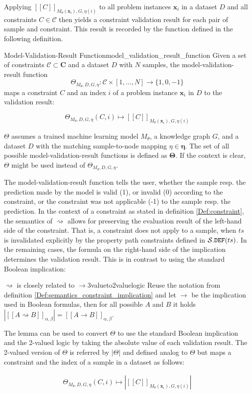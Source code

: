 Applying $[[C]]_{M_\theta(\mathbf{x}_i), G, \eta(i)}$ to all problem instances $\mathbf{x}_i$ in a dataset $D$ and all constraints $C \in \mathcal{C}$ then yields a constraint validation result for each pair of sample and constraint. This result is recorded by the function defined in the following definition.
\begin{Def}{Model-Validation-Result Function}{model_validation_result_function}
Given a set of constraints $\mathcal{C} \subset \mathbf{C}$ and a dataset $D$ with $N$ samples, the model-validation-result function 
\[\Theta_{M_\theta,D,G,\eta} : \mathcal{C} \times [1,...,N] \to \{1,0,-1\}\]
maps a constraint $C$ and an index $i$ of a problem instance $\mathbf{x}_i$ in $D$ to the validation result:

\[\Theta_{M_\theta,D,G,\eta}(C,i) \mapsto [[C]]_{M_\theta(\mathbf{x}_i), G, \eta(i)}\]

$\Theta$ assumes a trained machine learning model $M_\theta$, a knowledge graph $G$, and a dataset $D$ with the matching sample-to-node mapping $\eta \in \mathbf{\eta}$. The set of all possible model-validation-result functions is defined as $\mathbf{\Theta}$. If the context is clear, $\Theta$ might be used instead of $\Theta_{M_\theta,D,G,\eta}$.
\end{Def}

The model-validation-result function tells the user, whether the sample resp. the prediction made by the model is valid (1), or invalid (0) according to the constraint, or the constraint was not applicable (-1) to the sample resp. the prediction. In the context of a constraint as stated in definition \ref{Def:constraint}, the semantics of $\rightsquigarrow$ allows for preserving the evaluation result of the left-hand side of the constraint. That is, a constraint does not apply to a sample, when $ts$ is invalidated explicitly by the property path constraints defined in $\mathcal{S}.\texttt{DEF}(ts)$. In the remaining cases, the formula on the right-hand side of the implication determines the validation result. This is in contrast to using the standard Boolean implication:

\begin{Satz}{$\rightsquigarrow$ is closely related to $\rightarrow$}{3valueto2valuelogic}
Reuse the notation from definition \ref{Def:semantics_constraint_implication} and let $\rightarrow$ be the implication used in Boolean formulas, then for all possible $A$ and $B$ it holds $|[[A \rightsquigarrow B]]_{\alpha,\beta}| = [[A \rightarrow B]]_{\alpha,\beta}$.
\end{Satz}

The lemma can be used to convert $\Theta$ to use the standard Boolean implication and the 2-valued logic by taking the absolute value of each validation result. The 2-valued version of $\Theta$ is referred by $|\Theta|$ and defined analog to $\Theta$ but maps a constraint and the index of a sample in a dataset as follows:

\begin{gather}
    \Theta_{M_\theta,D,G,\eta}(C,i) \mapsto \left|[[C]]_{M_\theta(\mathbf{x}_i), G, \eta(i)}\right| \label{formular_two_valued_logic}
\end{gather}
